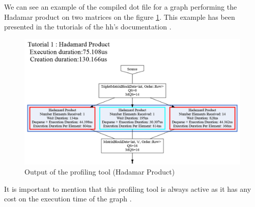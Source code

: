 We can see an example of the compiled dot file for a graph performing the
Hadamar product on two matrices on the figure \ref{fig:tuto1}. This example has
been presented in the tutorials of the \gls{hh}'s documentation \cite{hh:tuto}.

\begin{figure}[h!]
  \begin{center}
    \includegraphics[scale=0.4]{img/Tutorial1HadamardProduct.png}
    \caption{Output of the profiling tool (Hadamar Product)}
    \label{fig:tuto1}
  \end{center}
\end{figure}

It is important to mention that this profiling tool is always active as it has
any cost on the execution time of the graph \cite{bardakoff2021analysis}.
